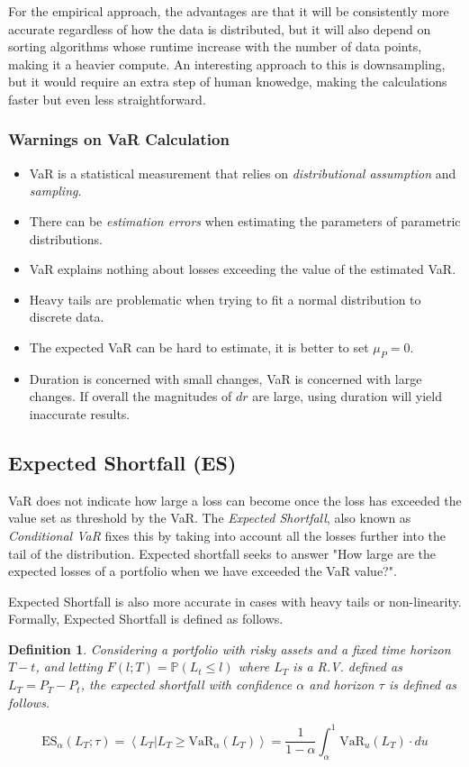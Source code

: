 \documentclass[10pt,letterpaper]{article}
\newtheorem{definition}{Definition}
\begin{document}
For the empirical approach, the advantages are that it will be consistently more accurate regardless of how the data is distributed, but it will also depend on sorting algorithms whose runtime increase with the number of data points, making it a heavier compute. An interesting approach to this is downsampling, but it would require an extra step of human knowedge, making the calculations faster but even less straightforward.

\subsubsection{Warnings on VaR Calculation}
\begin{itemize}
\item VaR is a statistical measurement that relies on \emph{distributional assumption} and \emph{sampling}.
\item There can be \emph{estimation errors} when estimating the parameters of parametric distributions.
\item VaR explains nothing about losses exceeding the value of the estimated VaR.
\item Heavy tails are problematic when trying to fit a normal distribution to discrete data.
\item The expected VaR can be hard to estimate, it is better to set $\mu_P = 0$.
\item Duration is concerned with small changes, VaR is concerned with large changes. If overall the magnitudes of $dr$ are large, using duration will yield inaccurate results.
\end{itemize}

\subsection{Expected Shortfall (ES)}
VaR does not indicate how large a loss can become once the loss has exceeded the value set as threshold by the VaR. The \emph{Expected Shortfall}, also known as \emph{Conditional VaR} fixes this by taking into account all the losses further into the tail of the distribution. Expected shortfall seeks to answer "How large are the expected losses of a portfolio when we have exceeded the VaR value?".

Expected Shortfall is also more accurate in cases with heavy tails or non-linearity. Formally, Expected Shortfall is defined as follows.

\begin{definition}\label{expectedshortfalldef}
Considering a portfolio with risky assets and a fixed time horizon $T-t$, and letting $F(l; T) = \mathbb{P}(L_t \leq l)$ where $L_T$ is a R.V. defined as $L_T=P_T - P_t$, the expected shortfall with confidence $\alpha$ and horizon $\tau$ is defined as follows.

\begin{equation}\label{expectedshortfall}
\mbox{ES}_\alpha(L_T;\tau ) = \left\langle L_T \vert L_T \geq \mbox{VaR}_\alpha(L_T)\right\rangle = \frac{1}{1-\alpha}\int_\alpha^1 \mbox{VaR}_u(L_T)\cdot du
\end{equation}
\end{definition}
\end{document}
